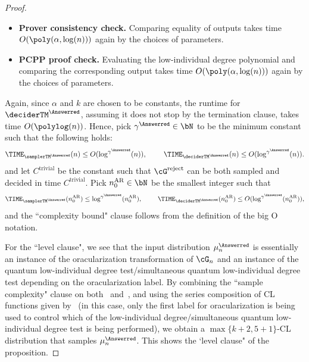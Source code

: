 \begin{proof}
\begin{itemize}
	\item \textbf{Prover consistency check. } Comparing equality of outputs takes time $O(\poly(\alpha, \log(n)))$ again by the choices of parameters. 
	\item \textbf{PCPP proof check. } Evaluating the low-individual degree polynomial and comparing the corresponding output takes time $O(\poly(\alpha, \log(n)))$ again by the choices of parameters. 
\end{itemize}
Again, since $\alpha$ and $k$ are chosen to be constants, the runtime for $\deciderTM^{\Answerred}$, assuming it does not stop by the termination clause, takes time $O(\polylog(n))$. Hence, pick $\gamma^{\Answerred} \in \bN$ to be the minimum constant such that the following holds: 
\begin{equation}
	\TIME_{\samplerTM^{\Answerred}} (n) \leq O(\log^{\gamma^{\Answerred}}(n)), \, \qquad \, \TIME_{\deciderTM^{\Answerred}} (n) \leq O(\log^{\gamma^{\Answerred}}(n)). 
\end{equation}
and let $C^{\text{trivial}}$ be the constant such that $\cG^{\text{reject}}$ can be both sampled and decided in time $C^{\text{trivial}}$. Pick $n_0^{\text{AR}} \in \bN$ be the smallest integer such that 
\begin{equation}
		\TIME_{\samplerTM^{\Answerred}}(n_0^{\text{AR}}) \leq \log^{\gamma^{\Answerred}}(n_0^{\text{AR}}), \, \qquad \, \TIME_{\deciderTM^{\Answerred}} (n_0^{\text{AR}}) \leq O(\log^{\gamma^{\Answerred}}(n_0^{\text{AR}})), 
\end{equation}
and the ``complexity bound" clause follows from the definition of the big O notation. 

For the ``level clause", we see that the input distribution $\mu_n^{\Answerred}$ is essentially an instance of the oracularization transformation of $\cG_n$ and an instance of the quantum low-individual degree test/simultaneous quantum low-individual degree test depending on the oracularization label. By combining the ``sample complexity" clause on both~ and~, and using the series composition of CL functions given by~ (in this case, only the first label for oracularization is being used to control which of the low-individual degree/simultaneous quantum low-individual degree test is being performed), we obtain a $\max\{ k+2, 5+1\}$-CL distribution that samples $\mu_n^{\Answerred}$. This shows the `level clause" of the proposition. 


\end{proof}
